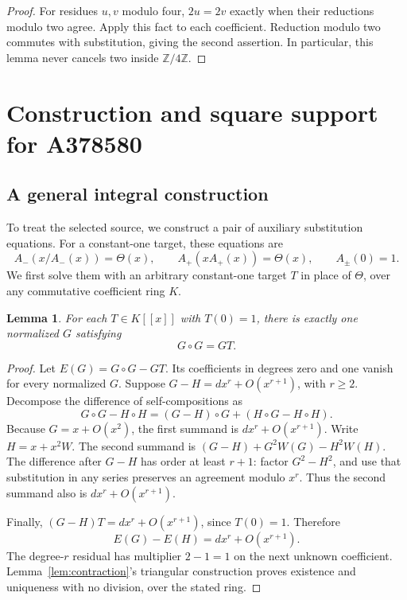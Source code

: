 \documentclass[11pt,a4paper]{article}
\newtheorem{lemma}[theorem]{Lemma}
\theoremstyle{remark}
\newcommand{\Z}{\mathbb Z}
\newcommand{\ps}[1]{#1[[x]]}
\begin{document}
\begin{proof}
For residues $u,v$ modulo four, $2u=2v$ exactly when their reductions modulo
two agree. Apply this fact to each coefficient. Reduction modulo two
commutes with substitution, giving the second assertion. In particular,
this lemma never cancels two inside $\Z/4\Z$.
\end{proof}

\section{Construction and square support for A378580}

\subsection{A general integral construction}

To treat the selected source, we construct a pair of auxiliary substitution
equations. For a constant-one target, these equations are
\begin{equation}\label{eq:thetaoriginal}
 A_-(x/A_-(x))=\Theta(x),\qquad
 A_+(xA_+(x))=\Theta(x),\qquad A_\pm(0)=1.
\end{equation}
We first solve them with an arbitrary constant-one target $T$ in place
of $\Theta$, over any commutative coefficient ring $K$.

\begin{lemma}\label{lem:normalroot}
For each $T\in\ps K$ with $T(0)=1$, there is exactly one normalized $G$
satisfying
\begin{equation}\label{eq:normalroot}
 G\circ G=GT.
\end{equation}
\end{lemma}

\begin{proof}
Let $E(G)=G\circ G-GT$. Its coefficients in degrees zero and one vanish
for every normalized $G$. Suppose $G-H=d x^r+O(x^{r+1})$, with $r\ge2$.
Decompose the difference of self-compositions as
\[
 G\circ G-H\circ H=(G-H)\circ G+(H\circ G-H\circ H).
\]
Because $G=x+O(x^2)$, the first summand is
$d x^r+O(x^{r+1})$. Write $H=x+x^2W$. The second summand is
$(G-H)+G^2W(G)-H^2W(H)$. The difference after $G-H$ has order at least
$r+1$: factor $G^2-H^2$, and use that substitution in any series
preserves an agreement modulo $x^r$. Thus the second summand also is
$d x^r+O(x^{r+1})$.

Finally, $(G-H)T=d x^r+O(x^{r+1})$, since $T(0)=1$. Therefore
\[
 E(G)-E(H)=d x^r+O(x^{r+1}).
\]
The degree-$r$ residual has multiplier $2-1=1$ on the next unknown
coefficient. Lemma~\ref{lem:contraction}'s triangular construction proves
existence and uniqueness with no division, over the stated ring.
\end{proof}
\end{document}
